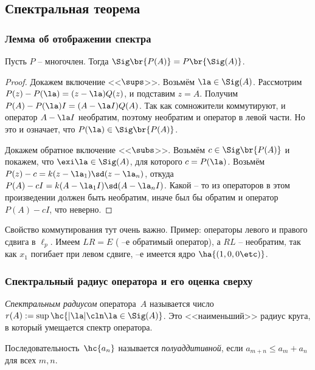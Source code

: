 \documentclass[a4paper]{article}
\begin{document}
\subsection{Спектральная теорема}

\subsubsection{Лемма об отображении спектра}

\begin{lemma}
Пусть $P$ -- многочлен. Тогда $\Sig\br{P(A)} = P\br{\Sig(A)}$.
\end{lemma}
\begin{proof}
Докажем включение <<$\sups$>>. Возьмём $\la \in \Sig(A)$. Рассмотрим $P(z) - P(\la) = (z-\la)Q(z)$, и
подставим $z = A$. Получим $P(A) - P(\la)I = (A - \la I)Q(A)$. Так как сомножители коммутируют, и оператор
$A - \la I$ необратим, поэтому необратим и оператор в левой части. Но это и означает, что $P(\la) \in \Sig\br{P(A)}$.

Докажем обратное включение <<$\subs$>>. Возьмём $c \in \Sig\br{P(A)}$ и покажем, что $\exi \la \in \Sig(A)$,
для которого $c = P(\la)$. Возьмём $P(z) - c = k(z-\la_1)\sd (z-\la_n)$, откуда
$P(A) - c I = k(A - \la_1 I)\sd (A - \la_n I)$. Какой -- то из операторов в этом произведении должен быть
необратим, иначе был бы обратим и оператор $P(A) - cI$, что неверно.
\end{proof}

\begin{note}
Свойство коммутирования тут очень важно. Пример: операторы левого и правого сдвига в $\ell_p$. Имеем $LR=E$
( --е обратимый оператор), а $RL$ -- необратим, так как $x_1$ погибает при левом сдвиге,  --е имеется ядро $\ha{(1,0,0\etc)}$.
\end{note}

\subsubsection{Спектральный радиус оператора и его оценка сверху}

\begin{df}
\emph{Спектральным радиусом} оператора~$A$ называется число $r(A) := \sup\hc{|\la| \cln \la \in \Sig(A)}$.
Это <<наименьший>> радиус круга, в который умещается спектр оператора.
\end{df}

\begin{df}
Последовательность~$\hc{a_n}$ называется \emph{полуаддитивной}, если $a_{m+n} \le a_m + a_n$ для всех $m,n$.
\end{df}
\end{document}
